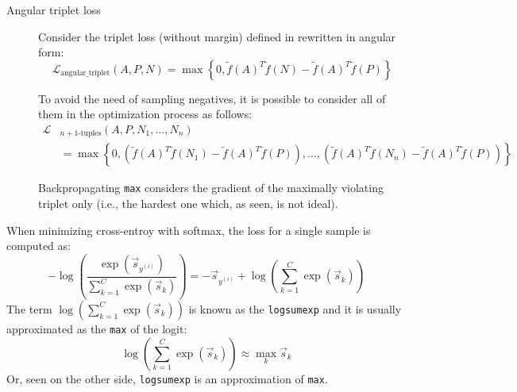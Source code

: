 \begin{description}
    \item[Angular triplet loss] 
        Consider the triplet loss (without margin) defined in  rewritten in angular form:
        \[ \mathcal{L}_\text{angular\_triplet}(A, P, N) = \max \left\{ 0, \tilde{f}(A)^T \tilde{f}(N) - \tilde{f}(A)^T \tilde{f}(P) \right\} \]

        To avoid the need of sampling negatives, it is possible to consider all of them in the optimization process as follows:
        \[ 
            \begin{split}
                \mathcal{L}&_\text{$n+1$-tuples}(A, P, N_1, \dots, N_n) \\
                &= \max \left\{ 
                    0, 
                    \left(\tilde{f}(A)^T \tilde{f}(N_1) - \tilde{f}(A)^T \tilde{f}(P)\right),
                    \dots,
                    \left(\tilde{f}(A)^T \tilde{f}(N_n) - \tilde{f}(A)^T \tilde{f}(P)\right)
                \right\} 
            \end{split}
        \]

        \begin{remark}
            Backpropagating \texttt{max} considers the gradient of the maximally violating triplet only (i.e., the hardest one which, as seen, is not ideal).
        \end{remark}
\end{description}

\begin{remark}
    When minimizing cross-entroy with softmax, the loss for a single sample is computed as:
    \[ 
        -\log\left( \frac{ \exp(\vec{s}_{y^{(i)}}) }{\sum_{k=1}^{C} \exp(\vec{s}_k)} \right) =
        - \vec{s}_{y^{(i)}} + \log\left( \sum_{k=1}^{C} \exp(\vec{s}_k) \right)
    \]
    The term $\log( \sum_{k=1}^{C} \exp(\vec{s}_k) )$ is known as the \texttt{logsumexp} and it is usually approximated as the \texttt{max} of the logit:
    \[ \log \left( \sum_{k=1}^{C} \exp(\vec{s}_k) \right) \approx \max_k \vec{s}_k \]
    Or, seen on the other side, \texttt{logsumexp} is an approximation of \texttt{max}.
\end{remark}

